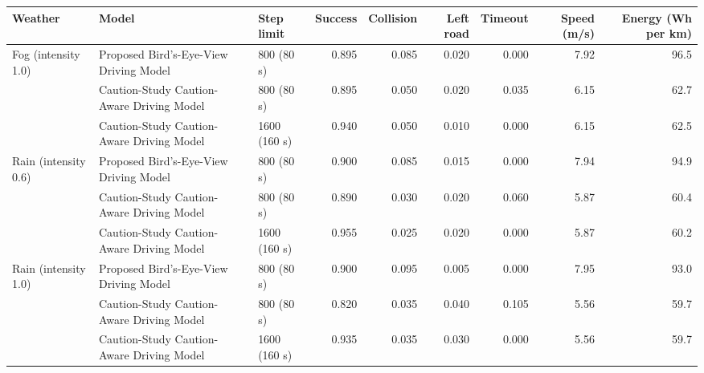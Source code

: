 \begin{tabular}{@{}lllrrrrrr@{}}\toprule
Weather & Model & Step limit & Success & Collision & Left road & Timeout & Speed (m/s) & Energy (Wh per km)\\\midrule
Fog (intensity 1.0) & Proposed Bird's-Eye-View Driving Model & 800 (80 s) & 0.895 & 0.085 & 0.020 & 0.000 & 7.92 & 96.5\\
 & Caution-Study Caution-Aware Driving Model & 800 (80 s) & 0.895 & 0.050 & 0.020 & 0.035 & 6.15 & 62.7\\
 & Caution-Study Caution-Aware Driving Model & 1600 (160 s) & 0.940 & 0.050 & 0.010 & 0.000 & 6.15 & 62.5\\
\midrule
Rain (intensity 0.6) & Proposed Bird's-Eye-View Driving Model & 800 (80 s) & 0.900 & 0.085 & 0.015 & 0.000 & 7.94 & 94.9\\
 & Caution-Study Caution-Aware Driving Model & 800 (80 s) & 0.890 & 0.030 & 0.020 & 0.060 & 5.87 & 60.4\\
 & Caution-Study Caution-Aware Driving Model & 1600 (160 s) & 0.955 & 0.025 & 0.020 & 0.000 & 5.87 & 60.2\\
\midrule
Rain (intensity 1.0) & Proposed Bird's-Eye-View Driving Model & 800 (80 s) & 0.900 & 0.095 & 0.005 & 0.000 & 7.95 & 93.0\\
 & Caution-Study Caution-Aware Driving Model & 800 (80 s) & 0.820 & 0.035 & 0.040 & 0.105 & 5.56 & 59.7\\
 & Caution-Study Caution-Aware Driving Model & 1600 (160 s) & 0.935 & 0.035 & 0.030 & 0.000 & 5.56 & 59.7\\
\bottomrule\end{tabular}

